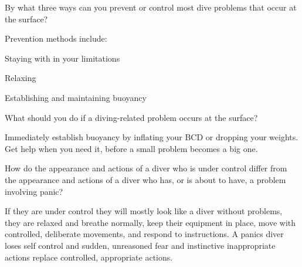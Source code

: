 	\begin{qanda}
		\begin{question}
By what three ways can you prevent or control most dive problems that occur at the surface?
		\end{question}

		\begin{answer}
Prevention methods include:
			\begin{nospacenumberedlist}
				\item Staying with in your limitations
				\item Relaxing
				\item Establishing and maintaining buoyancy
			\end{nospacenumberedlist}
		\end{answer}
	\end{qanda}

	\begin{qanda}
		\begin{question}
What should you do if a diving-related problem occurs at the surface?
		\end{question}

		\begin{answer}
Immediately establish buoyancy by inflating your BCD or dropping your weights.  Get help when you need it, before a small problem becomes a big one.
		\end{answer}
	\end{qanda}

	\begin{qanda}
		\begin{question}
How do the appearance and actions of a diver who is under control differ from the appearance and actions of a diver who has, or is about to have, a problem involving panic?
		\end{question}

		\begin{answer}
If they are under control they will mostly look like a diver without problems, they are relaxed and breathe normally, keep their equipment in place, move with controlled, deliberate movements, and respond to instructions.  A panics diver loses self control and sudden, unreasoned fear and instinctive inappropriate actions replace controlled, appropriate actions.
		\end{answer}
	\end{qanda}


